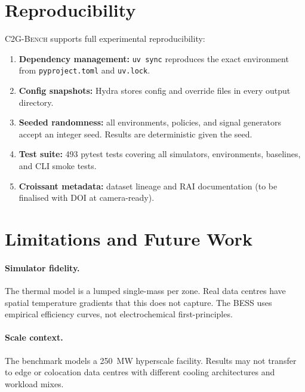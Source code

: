 \documentclass{article}
\newcommand{\cname}{\textsc{C2G-Bench}}
\begin{document}
\section{Reproducibility}
\label{sec:reproducibility}

\cname{} supports full experimental reproducibility:

\begin{enumerate}[leftmargin=*, itemsep=2pt]
  \item \textbf{Dependency management:} \texttt{uv sync} reproduces the exact
        environment from \texttt{pyproject.toml} and \texttt{uv.lock}.
  \item \textbf{Config snapshots:} Hydra stores config and override files
        in every output directory.
  \item \textbf{Seeded randomness:} all environments, policies, and signal
        generators accept an integer seed. Results are deterministic given
        the seed.
  \item \textbf{Test suite:} 493 pytest tests covering all simulators,
        environments, baselines, and CLI smoke tests.
  \item \textbf{Croissant metadata:} dataset lineage and RAI documentation
        (to be finalised with DOI at camera-ready).
\end{enumerate}

\section{Limitations and Future Work}
\label{sec:limitations}

\paragraph{Simulator fidelity.}
The thermal model is a lumped single-mass per zone. Real data centres have
spatial temperature gradients that this does not capture.
The BESS uses empirical efficiency curves, not electrochemical first-principles.

\paragraph{Scale context.}
The benchmark models a 250~MW hyperscale facility. Results may not transfer
to edge or colocation data centres with different cooling architectures
and workload mixes.
\end{document}
